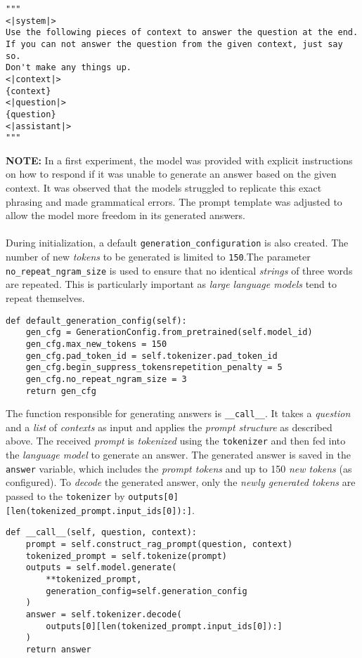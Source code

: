 \documentclass{article}
\begin{document}
\begin{lstlisting}[backgroundcolor = \color{lightgray!25}]
"""
<|system|>
Use the following pieces of context to answer the question at the end. 
If you can not answer the question from the given context, just say so.
Don't make any things up.
<|context|>
{context}
<|question|>
{question}
<|assistant|>
"""
\end{lstlisting}
\textbf{NOTE:} In a first experiment, the model was provided with explicit instructions on how to respond if it was unable to generate an answer based on the given context. It was observed that the models struggled to replicate this exact phrasing and made grammatical errors. The prompt template was adjusted to allow the model more freedom in its generated answers.\\
\\
During initialization, a default \colorbox{lightgray!25}{\lstinline{generation_configuration}} is also created. The number of new \textit{tokens} to be generated is limited to \colorbox{lightgray!25}{\lstinline{150}}.The parameter \colorbox{lightgray!25}{\lstinline{no_repeat_ngram_size}} is used to ensure that no identical \textit{strings} of three words are repeated. This is particularly important as \textit{large language models} tend to repeat themselves.

\begin{lstlisting}[backgroundcolor = \color{lightgray!25}]
def default_generation_config(self):
    gen_cfg = GenerationConfig.from_pretrained(self.model_id)
    gen_cfg.max_new_tokens = 150
    gen_cfg.pad_token_id = self.tokenizer.pad_token_id
    gen_cfg.begin_suppress_tokensrepetition_penalty = 5
    gen_cfg.no_repeat_ngram_size = 3
    return gen_cfg
\end{lstlisting}

The function responsible for generating answers is \colorbox{lightgray!25}{\lstinline{__call__}}.   It takes a \textit{question} and a \textit{list} of \textit{contexts} as input and applies the \textit{prompt structure} as described above. The received \textit{prompt} is \textit{tokenized} using the \colorbox{lightgray!25}{\lstinline{tokenizer}} and then fed into the \textit{language model} to generate an answer.
The generated answer is saved in the \colorbox{lightgray!25}{\lstinline{answer}} variable, which includes the \textit{prompt tokens} and up to 150 \textit{new tokens} (as configured). To \textit{decode} the generated answer, only the \textit{newly generated tokens} are passed to the \colorbox{lightgray!25}{\lstinline{tokenizer}} by \colorbox{lightgray!25}{\lstinline{outputs[0][len(tokenized_prompt.input_ids[0]):]}}.
\begin{lstlisting}[backgroundcolor = \color{lightgray!25}]
def __call__(self, question, context):
    prompt = self.construct_rag_prompt(question, context)
    tokenized_prompt = self.tokenize(prompt)
    outputs = self.model.generate(
        **tokenized_prompt, 
        generation_config=self.generation_config
    )
    answer = self.tokenizer.decode(
        outputs[0][len(tokenized_prompt.input_ids[0]):]
    )
    return answer
\end{lstlisting}
\end{document}

